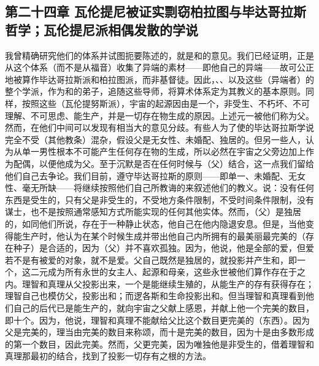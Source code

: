 
\subsection{第二十四章 瓦伦提尼被证实剽窃柏拉图与毕达哥拉斯哲学；瓦伦提尼派相偶发散的学说}

我曾精确研究他们的体系并试图扼要陈述的，就是和的意见。我们已经证明，正是从这个体系（而不是从福音）收集了异端的素材——即他自己的异端——故可公正地被算作毕达哥拉斯派和柏拉图派，而非基督徒。因此，、、以及这些（异端者）的整个学派，作为和的弟子，追随这些导师，将算术体系定为其教义的基本原则。同样，按照这些（瓦伦提努斯派），宇宙的起源因由是一个，非受生、不朽坏、不可理解、不可思虑、能生产，并是一切存在物生成的原因。上述元一被他们称为父。然而，在他们中间可以发现有相当大的意见分歧。有些人为了使的毕达哥拉斯学说完全不受（其他教条）混杂，假设父是无女性、未婚配、独居的。但另一些人，认为从单一男性根本不可能产生任何存在物的生成，所以必然在宇宙之父旁边加上作为配偶，以便他成为父。至于沉默是否在任何时候与（父）结合，这一点我们留给他们自己去争论。我们目前，遵守毕达哥拉斯的原则——即单一、未婚配、无女性、毫无所缺——将继续按照他们自己所教诲的来叙述他们的教义。说：没有任何东西是受生的，只有父是非受生的，不受地方条件限制，不受时间条件限制，没有谋士，也不是按照通常感知方式所能实现的任何其他实体。然而，（父）是独居的，如同他们所说，存在于一种静止状态，他自己在他内隐退安息。但是，当他变得能生产时，他认为在某个时候生成并带出他自己内所拥有的最美丽最完美的（存在种子）是合适的，因为（父）并不喜欢孤独。因为，他说，他是全部的爱，但爱若不是有被爱的对象，就不是爱。父自己既然是独居的，就投影并产生和，即一个，这二元成为所有永世的女主人、起源和母亲，这些永世被他们算作存在于之内。理智和真理从父投影出来，一个是能继续生殖的，从能生产的存有获得存在；理智自己也模仿父，投影出和；而逻各斯和生命投影出和。但当理智和真理看到他们自己的后代已是能生产的，就向宇宙之父献上感恩，并献上他一个完美的数目，即十个。因为，他说，理智和真理不能献给父比这个数目更完美的（东西）。因为父是完美的，理当由完美的数目来称颂，而十是完美的数目，因为十是由多数形成的第一个数目，因此完美。然而，父更完美，因为唯独他是非受生的，借着理智和真理那最初的结合，找到了投影一切存有之根的方法。\par


